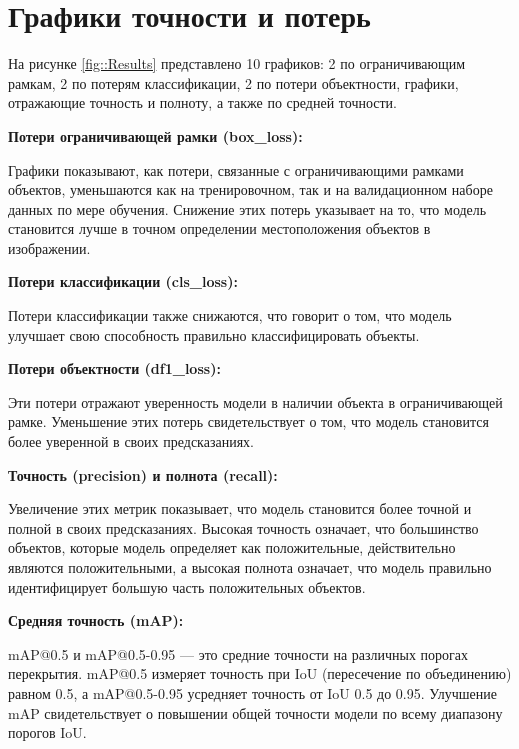 \section{Графики точности и потерь}

На рисунке \ref{fig::Results} представлено 10 графиков: 2 по ограничивающим рамкам, 2 по
потерям классификации, 2 по потери объектности, графики, отражающие точность и полноту, а
также по средней точности. 


\textbf{Потери ограничивающей рамки (box\_loss):}

Графики показывают, как потери, связанные с ограничивающими рамками объектов, уменьшаются как на тренировочном, так и на валидационном наборе данных по мере обучения.
Снижение этих потерь указывает на то, что модель становится лучше в точном определении местоположения объектов в изображении.

\textbf{Потери классификации (cls\_loss):}

Потери классификации также снижаются, что говорит о том, что модель улучшает свою способность правильно классифицировать объекты.

\textbf{Потери объектности (df1\_loss):}

Эти потери отражают уверенность модели в наличии объекта в ограничивающей рамке. Уменьшение этих потерь свидетельствует о том, что модель становится более уверенной в своих предсказаниях.

\textbf{Точность (precision) и полнота (recall):}

Увеличение этих метрик показывает, что модель становится более точной и полной в своих предсказаниях. Высокая точность означает, что большинство объектов, которые модель определяет как положительные, действительно являются положительными, а высокая полнота означает, что модель правильно идентифицирует большую часть положительных объектов.

\textbf{Средняя точность (mAP):}

mAP@0.5 и mAP@0.5-0.95 — это средние точности на различных порогах перекрытия. mAP@0.5 измеряет точность при IoU (пересечение по объединению) равном 0.5, а mAP@0.5-0.95 усредняет точность от IoU 0.5 до 0.95. Улучшение mAP свидетельствует о повышении общей точности модели по всему диапазону порогов IoU.

